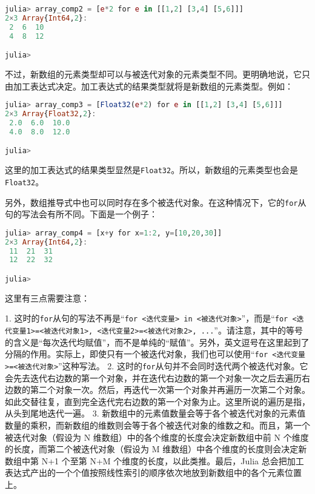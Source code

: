 \begin{lstlisting}[language=julia]
julia> array_comp2 = [e*2 for e in [[1,2] [3,4] [5,6]]]
2×3 Array{Int64,2}:
 2  6  10
 4  8  12

julia> 
\end{lstlisting}

不过，新数组的元素类型却可以与被迭代对象的元素类型不同。更明确地说，它只由加工表达式决定。加工表达式的结果类型就将是新数组的元素类型。例如：

\begin{lstlisting}[language=julia]
julia> array_comp3 = [Float32(e*2) for e in [[1,2] [3,4] [5,6]]]
2×3 Array{Float32,2}:
 2.0  6.0  10.0
 4.0  8.0  12.0

julia> 
\end{lstlisting}

这里的加工表达式的结果类型显然是\verb`Float32`。所以，新数组的元素类型也会是\verb`Float32`。

另外，数组推导式中也可以同时存在多个被迭代对象。在这种情况下，它的\verb`for`从句的写法会有所不同。下面是一个例子：

\begin{lstlisting}[language=julia]
julia> array_comp4 = [x+y for x=1:2, y=[10,20,30]]
2×3 Array{Int64,2}:
 11  21  31
 12  22  32

julia> 
\end{lstlisting}

这里有三点需要注意：

1. 这时的\verb`for`从句的写法不再是“\verb`for <迭代变量> in <被迭代对象>`”，而是“\verb`for <迭代变量1>=<被迭代对象1>, <迭代变量2>=<被迭代对象2>, ...`”。请注意，其中的等号的含义是“每次迭代均赋值”，而不是单纯的“赋值”。另外，英文逗号在这里起到了分隔的作用。实际上，即使只有一个被迭代对象，我们也可以使用“\verb`for <迭代变量>=<被迭代对象>`”这种写法。
2. 这时的\verb`for`从句并不会同时迭代两个被迭代对象。它会先去迭代右边数的第一个对象，并在迭代右边数的第一个对象一次之后去遍历右边数的第二个对象一次。然后，再迭代一次第一个对象并再遍历一次第二个对象。如此交替往复，直到完全迭代完右边数的第一个对象为止。这里所说的遍历是指，从头到尾地迭代一遍。
3. 新数组中的元素值数量会等于各个被迭代对象的元素值数量的乘积，而新数组的维数则会等于各个被迭代对象的维数之和。而且，第一个被迭代对象（假设为 N 维数组）中的各个维度的长度会决定新数组中前 N 个维度的长度，而第二个被迭代对象（假设为 M 维数组）中各个维度的长度则会决定新数组中第 N+1 个至第 N+M 个维度的长度，以此类推。最后，Julia 总会把加工表达式产出的一个个值按照线性索引的顺序依次地放到新数组中的各个元素位置上。


